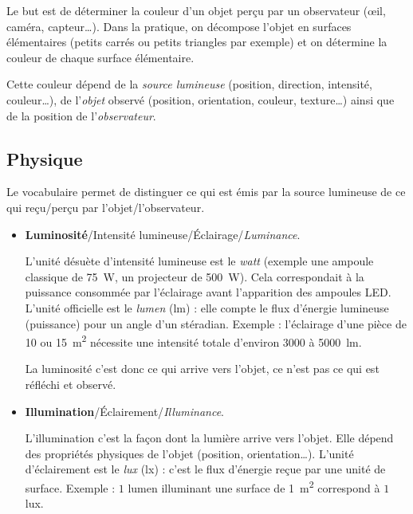 \documentclass[11pt,class=report,crop=false]{standalone}
\begin{document}

Le but est de déterminer la couleur d'un objet perçu par un observateur (\oe{}il, caméra, capteur\ldots). Dans la pratique, on décompose l'objet en surfaces élémentaires (petits carrés ou petits triangles par exemple) et on détermine la couleur de chaque surface élémentaire.

Cette couleur dépend de la \emph{source lumineuse} (position, direction, intensité, couleur\ldots), de l'\emph{objet} observé (position, orientation, couleur, texture\ldots) ainsi que de la position de l'\emph{observateur}.

\subsection{Physique}

Le vocabulaire permet de distinguer ce qui est émis par la source lumineuse de ce qui reçu/perçu par l'objet/l'observateur.

\begin{itemize}
  \item \textbf{Luminosité}/Intensité lumineuse/Éclairage/\emph{Luminance}.

  L'unité désuète d'intensité lumineuse est le \emph{watt} (exemple une ampoule classique de \SI{75}{\watt}, un projecteur de \SI{500}{\watt}). Cela correspondait à la puissance consommée par l'éclairage avant l'apparition des ampoules LED. L'unité officielle est le \emph{lumen} (lm) : elle compte le flux d'énergie lumineuse (puissance) pour un angle d'un stéradian.
  Exemple : l'éclairage d'une pièce de 10 ou \SI{15}{\meter^2} nécessite une intensité totale d'environ 3000 à \SI{5000}{\lumen}.  

  La luminosité c'est donc ce qui arrive vers l'objet, ce n'est pas ce qui est réfléchi et observé.

  \item\textbf{Illumination}/Éclairement/\emph{Illuminance}.

  L'illumination c'est la façon dont la lumière arrive vers l'objet. Elle dépend des propriétés physiques de l'objet (position, orientation\ldots).
  L'unité d'éclairement est le \emph{lux} (lx) : c'est le flux d'énergie reçue par une unité de surface. Exemple : $1$ lumen illuminant une surface de \SI{1}{\meter^2} correspond à $1$ lux. 
\end{itemize}
\end{document}

